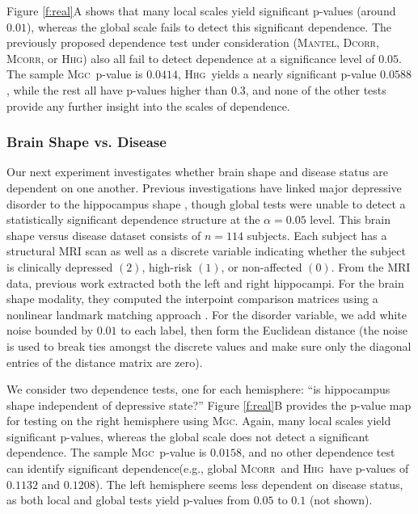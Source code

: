 \documentclass[11pt]{article}
\providecommand{\sct}[1]{{\normalfont\textsc{#1}}}
\newcommand{\Mgc}{\sct{Mgc}}
\newcommand{\Hhg}{\sct{Hhg}}
\newcommand{\Dcorr}{\sct{Dcorr}}
\newcommand{\Mcorr}{\sct{Mcorr}}
\newcommand{\Mantel}{\sct{Mantel}}
\begin{document}


Figure \ref{f:real}{\color{magenta}A}  shows that many local scales yield significant p-values (around $0.01$), whereas the global scale fails to detect this significant dependence. The previously proposed dependence test under consideration (\Mantel, \Dcorr, \Mcorr, or \Hhg) also all fail to detect dependence at a significance level of $0.05$. The sample \Mgc~p-value is $0.0414$, \Hhg~yields a nearly significant p-value $0.0588$, while the rest all have p-values higher than $0.3$, and none of the other tests provide any further insight into the scales of dependence.


\subsubsection*{Brain Shape vs. Disease} %


Our next experiment investigates whether brain shape and disease status are dependent on one another.  Previous investigations have linked major depressive disorder to the hippocampus shape \cite{ParkEtAl2008,PosenerEtAl2003}, though global tests were unable to detect a statistically significant dependence structure at the $\alpha=0.05$ level.
%
This brain shape versus disease dataset consists of $n=114$ subjects. Each subject has a structural MRI scan as well as a discrete variable indicating whether the subject is clinically depressed $(2)$, high-risk $(1)$, or non-affected $(0)$.  From the MRI data, previous work  extracted both the left and right hippocampi.   For the brain shape modality, they computed the interpoint comparison matrices using a nonlinear landmark matching approach \cite{ParkEtAl2008,BegEtAl2005}. For the  disorder variable, we add white noise bounded by $0.01$ to each label, then form the Euclidean distance (the noise is used to break ties amongst the discrete values and make sure only the diagonal entries of the distance matrix are zero).

We consider two dependence tests, one for each hemisphere: ``is hippocampus shape independent of depressive state?''
Figure \ref{f:real}{\color{magenta}B} provides the p-value map for testing on the right hemisphere using \Mgc. Again, many local scales yield significant p-values, whereas the global scale does not detect a significant dependence. The sample \Mgc~p-value is $0.0158$, and no other dependence test can identify significant dependence(e.g., global \Mcorr~and \Hhg~have p-values of $0.1132$ and $0.1208$). The left hemisphere seems less dependent on disease status, as both local and global tests yield p-values from $0.05$ to $0.1$ (not shown). 
\end{document}
